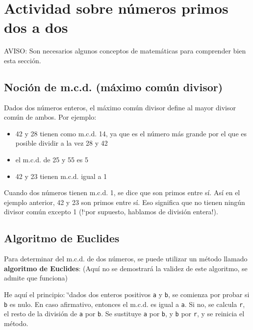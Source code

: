 \documentclass[12pt,twoside,spanish,a4paper]{report}
\begin{document}
\newpage{}

\chapter{Actividad sobre n\'umeros primos dos a dos}
   \label{sec:Actividad-Primos}

\noindent AVISO: Son necesarios algunos conceptos de matem\'aticas para comprender
bien esta secci\'on.

\section{Noci\'on de m.c.d. (m\'aximo com\'un divisor)}
  \label{sub:Nocion-de-m.c.d.}

Dados dos n\'umeros enteros, el m\'aximo com\'un divisor define al mayor
divisor com\'un de ambos. Por ejemplo:
\begin{itemize}
   \item 42 y 28 tienen como m.c.d. 14, ya que es el n\'umero m\'as grande por
      el que es posible dividir a la vez 28 y 42
   \item el m.c.d. de 25 y 55 es 5
   \item 42 y 23 tienen m.c.d. igual a 1
\end{itemize}
Cuando dos n\'umeros tienen m.c.d. 1, se dice que son primos entre s\'i.
As\'i en el ejemplo anterior, 42 y 23 son primos entre s\'i. Eso significa
que no tienen ning\'un divisor com\'un excepto 1 (!`por supuesto, hablamos
de divisi\'on entera!).

\section{Algoritmo de Euclides}
    \label{sub:Algoritmo-de-Euclides}

Para determinar del m.c.d. de dos n\'umeros, se puede utilizar un m\'etodo
llamado \textbf{algoritmo de Euclides}: (Aqu\'i no se demostrar\'a la
validez de este algoritmo, se admite que funciona)

He aqu\'i el principio: \char`\"{}dados dos enteros positivos \texttt{a} y
\texttt{b}, se comienza por probar si \texttt{b} es nulo. En caso afirmativo,
entonces el m.c.d. es igual a \texttt{a}. Si no, se calcula \texttt{r}, el
resto  de la divisi\'on de \texttt{a} por \texttt{b}. Se sustituye \texttt{a}
por \texttt{b}, y \texttt{b} por \texttt{r}, y se reinicia el m\'etodo.
\end{document}
